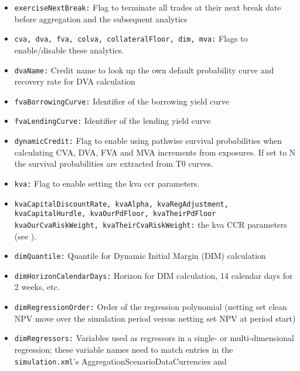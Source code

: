 {\begin{itemize}
value vanishes while the exposure does not. This parameter acts as a cutoff for the marginal allocation when the
absolute netting set value falls below this limit and switches to equal distribution of the exposure in this case.
\item {\tt exerciseNextBreak:} Flag to terminate all trades at their next break date before aggregation and the
subsequent analytics
\item {\tt cva, dva, fva, colva, collateralFloor, dim, mva:} Flags to enable/disable these analytics. 
\item {\tt dvaName:} Credit name to look up the own default probability curve and recovery rate for DVA calculation
\item {\tt fvaBorrowingCurve:} Identifier of the borrowing yield curve
\item {\tt fvaLendingCurve:} Identifier of the lending yield curve
\item {\tt dynamicCredit:} Flag to enable using pathwise survival probabilities when calculating CVA, DVA, FVA and MVA increments from exposures. If set to N the survival probabilities are extracted from T0 curves.
\item {\tt kva:} Flag to enable setting the kva ccr parameters.
\item {\tt kvaCapitalDiscountRate, kvaAlpha, kvaRegAdjustment, kvaCapitalHurdle, kvaOurPdFloor, kvaTheirPdFloor kvaOurCvaRiskWeight, kvaTheirCvaRiskWeight:} the kva CCR parameters (see \cite{methods}).
\item {\tt dimQuantile:} Quantile for Dynamic Initial Margin (DIM) calculation
\item {\tt dimHorizonCalendarDays:} Horizon for DIM calculation, 14 calendar days for 2 weeks, etc.
\item {\tt dimRegressionOrder:} Order of the regression polynomial (netting set clean NPV move over the simulation
period versus netting set NPV at period start)
\item {\tt dimRegressors:} Variables used as regressors in a single- or multi-dimensional regression; these variable
  names need to match entries in the {\tt simulation.xml}'s AggregationScenarioDataCurrencies and

\end{itemize}}
